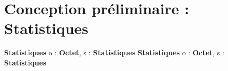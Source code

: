 \section{Conception préliminaire : Statistiques}

\begin{algorithme}
    {}{\textbf{Statistiques}}
    {}
    {o : \textbf{Octet}, s : \textbf{Statistiques}}
    {\textbf{Statistiques}}
    {}
    {o : \textbf{Octet}, s : \textbf{Statistiques}}
    {\naturel}
    {}
\end{algorithme}